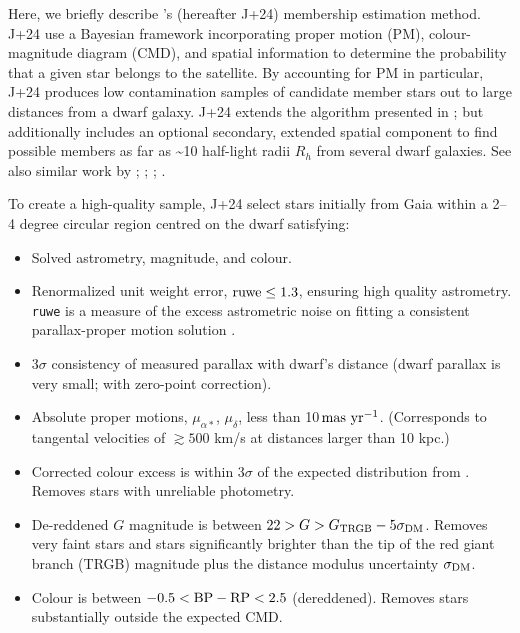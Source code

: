 Here, we briefly describe \citet{jensen+2024}'s (hereafter J+24)
membership estimation method. J+24 use a Bayesian framework
incorporating proper motion (PM), colour-magnitude diagram (CMD), and
spatial information to determine the probability that a given star
belongs to the satellite. By accounting for PM in particular, J+24
produces low contamination samples of candidate member stars out to
large distances from a dwarf galaxy. J+24 extends the algorithm
presented in \citet{MV2020a}; \citet{MV2020b} but additionally includes
an optional secondary, extended spatial component to find possible
members as far as \textasciitilde10 half-light radii \(R_h\) from
several dwarf galaxies. See also similar work by \citet{pace+li2019};
\citet{battaglia+2022}; \citet{pace+erkal+li2022}; \citet{qi+2022}.

To create a high-quality sample, J+24 select stars initially from Gaia
within a 2--4 degree circular region centred on the dwarf satisfying:

\begin{itemize}
\tightlist
\item
  Solved astrometry, magnitude, and colour.
\item
  Renormalized unit weight error, \({\rm ruwe} \leq 1.3\), ensuring high
  quality astrometry. \texttt{ruwe} is a measure of the excess
  astrometric noise on fitting a consistent parallax-proper motion
  solution \citep[see][]{lindegren+2021}.\\
\item
  3\(\sigma\) consistency of measured parallax with dwarf's distance
  (dwarf parallax is very small; with \citet{lindegren+2021} zero-point
  correction).
\item
  Absolute proper motions, \(\mu_{\alpha*}\), \(\mu_\delta\), less than
  10\(\,{\rm mas\ yr^{-1}}\). (Corresponds to tangental velocities of
  \(\gtrsim 500\) km/s at distances larger than 10 kpc.)
\item
  Corrected colour excess is within 3\(\sigma\) of the expected
  distribution from \citet{riello+2021}. Removes stars with unreliable
  photometry.
\item
  De-reddened \(G\) magnitude is between
  \(22 > G > G_{\rm TRGB} - 5\sigma_{\rm DM}\). Removes very faint stars
  and stars significantly brighter than the tip of the red giant branch
  (TRGB) magnitude plus the distance modulus uncertainty
  \(\sigma_{\rm DM}\).
\item
  Colour is between \(-0.5 < {\rm BP - RP} <  2.5\) (dereddened).
  Removes stars substantially outside the expected CMD.
\end{itemize}

